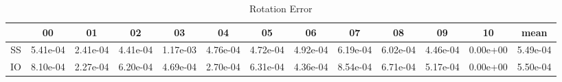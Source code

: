 \begin{table}[H!]
\centering
\begin{tabular}{|c|c|c|c|c|c|c|c|c|c|c|c|c|}
\hline
 & 00 & 01 & 02 & 03 & 04 & 05 & 06 & 07 & 08 & 09 & 10 & mean \\
\hline
SS & 5.41e-04 & 2.41e-04 & 4.41e-04 & 1.17e-03 & 4.76e-04 & 4.72e-04 & 4.92e-04 & 6.19e-04 & 6.02e-04 & 4.46e-04 & 0.00e+00 & 5.49e-04 \\
\hline
IO & 8.10e-04 & 2.27e-04 & 6.20e-04 & 4.69e-04 & 2.70e-04 & 6.31e-04 & 4.36e-04 & 8.54e-04 & 6.71e-04 & 5.17e-04 & 0.00e+00 & 5.50e-04 \\
\hline
\end{tabular}
\caption{Rotation Error}
\label{table:fig:r_err}
\end{table}
